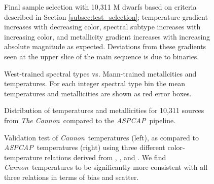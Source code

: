 \documentclass[modern]{aastex62}
\newcommand{\thecannon}{\textsl{The Cannon}}
\newcommand{\cannon}{\textsl{Cannon}}
\newcommand{\aspcap}{\textsl{ASPCAP}}
\begin{document}
\begin{figure}[ht]
\caption{Final sample selection with 10,311 M dwarfs based on criteria described in Section \ref{subsec:test_selection}; temperature gradient increases with decreasing color, spectral subtype increases with increasing color, and metallicity gradient increases with increasing absolute magnitude as expected. Deviations from these gradients seen at the upper slice of the main sequence is due to binaries. \label{fig:safe_selection}}
\end{figure}

\begin{figure}[ht]
\caption{West-trained spectral types vs. Mann-trained metallcities and temperatures. For each integer spectral type bin the mean temperatures and metallicities are shown as red error boxes. \label{fig:west_vs_mann}}
\end{figure}

\begin{figure}[ht]
\caption{Distribution of temperatures and metallicities for 10,311 sources from \thecannon\ compared to the \aspcap\ pipeline. \label{fig:aspcap_cannon_label_hist}}
\end{figure}

\begin{figure}[ht]
\caption{Validation test of \cannon\ temperatures (left), as compared to \aspcap\ temperatures (right) using three different color-temperature relations derived from \citealt{Mann:2015}, \citealt{Casagrande:2008}, and \citealt{Boyajian:2013}. We find \cannon\ temperatures to be significantly more consistent with all three relations in terms of bias and scatter. \label{fig:aspcap_cannon_validation}}
\end{figure}



\end{document}
